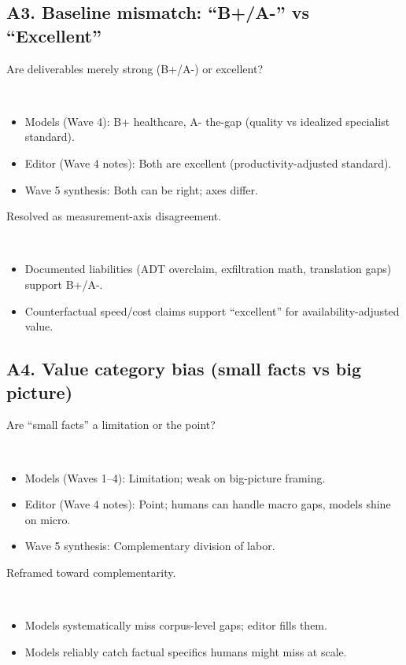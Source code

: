 \documentclass[11pt,letterpaper]{article}
\begin{document}
\subsection{A3. Baseline mismatch: ``B+/A-'' vs ``Excellent''}

\begin{reflist}
\item[Dispute:] Are deliverables merely strong (B+/A-) or excellent?
\item[Positions:]~
  \begin{itemize}[nosep]
    \item Models (Wave 4): B+ healthcare, A- the-gap (quality vs idealized specialist standard).
    \item Editor (Wave 4 notes): Both are excellent (productivity-adjusted standard).
    \item Wave 5 synthesis: Both can be right; axes differ.
  \end{itemize}
\item[Status:] Resolved as measurement-axis disagreement.
\item[Evidence:]~
  \begin{itemize}[nosep]
    \item Documented liabilities (ADT overclaim, exfiltration math, translation gaps) support B+/A-.
    \item Counterfactual speed/cost claims support ``excellent'' for availability-adjusted value.
  \end{itemize}
\end{reflist}

\subsection{A4. Value category bias (small facts vs big picture)}

\begin{reflist}
\item[Dispute:] Are ``small facts'' a limitation or the point?
\item[Positions:]~
  \begin{itemize}[nosep]
    \item Models (Waves 1--4): Limitation; weak on big-picture framing.
    \item Editor (Wave 4 notes): Point; humans can handle macro gaps, models shine on micro.
    \item Wave 5 synthesis: Complementary division of labor.
  \end{itemize}
\item[Status:] Reframed toward complementarity.
\item[Evidence:]~
  \begin{itemize}[nosep]
    \item Models systematically miss corpus-level gaps; editor fills them.
    \item Models reliably catch factual specifics humans might miss at scale.
  \end{itemize}
\end{reflist}
\end{document}
